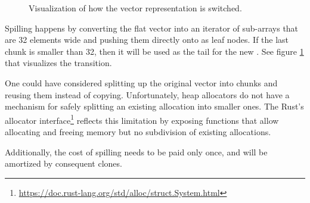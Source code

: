 \begin{figure}[!htbp]

    \caption{Visualization of how the vector representation is switched.}
    \label{fig:switching-representations}
\end{figure}

Spilling happens by converting the flat vector into an iterator of sub-arrays that are 32 elements wide and pushing them directly onto \rrbtree{} as leaf nodes. If the last chunk is smaller than 32, then it will be used as the tail for the new \rrbvec{}. See figure \ref{fig:switching-representations} that visualizes the transition.

One could have considered splitting up the original vector into chunks and reusing them instead of copying. Unfortunately, heap allocators do not have a mechanism for safely splitting an existing allocation into smaller ones. The Rust's allocator interface\footnote{\url{https://doc.rust-lang.org/std/alloc/struct.System.html}} reflects this limitation by exposing functions that allow allocating and freeing memory but no subdivision of existing allocations.

Additionally, the cost of spilling needs to be paid only once, and will be amortized by  consequent clones.

